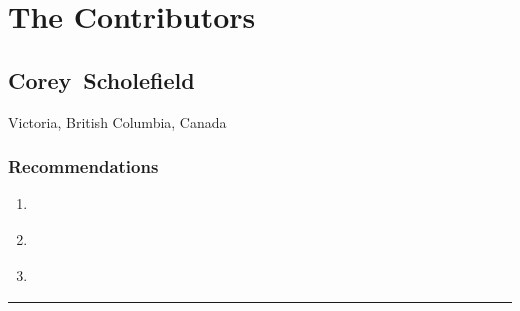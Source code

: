 \documentclass[11pt, oneside,american]{book}
\begin{document}
\mainmatter
\section{The Contributors}
\subsection{Corey~Scholefield} \textsf{Victoria, British Columbia, Canada} \smallskip {} \sffamily  \subsubsection{Recommendations}\begin{enumerate}
\item \cite{Hazelton2015}
\item \cite{Prasad2012}
\item \cite{Windley2005}
\end{enumerate}\noindent\rule{\textwidth}{0.2pt}
\printbibliography 
\end{document}
